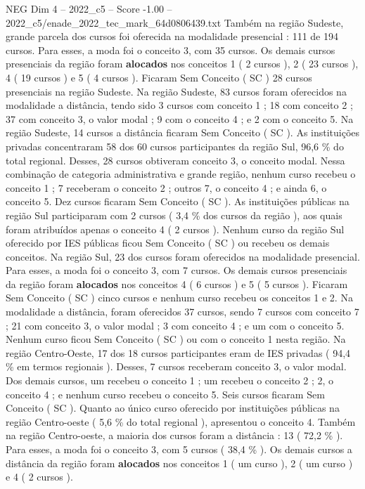 \begin{textsample}{NEG Dim 4 – 2022\_c5 – Score -1.00 – 2022\_c5/enade\_2022\_tec\_mark\_64d0806439.txt}
Também na região Sudeste, grande parcela dos cursos foi oferecida na modalidade presencial : 111 de 194 cursos.
Para esses, a moda foi o conceito 3, com 35 cursos.
Os demais cursos presenciais da região foram \textbf{alocados} nos conceitos 1 ( 2 cursos ), 2 ( 23 cursos ), 4 ( 19 cursos ) e 5 ( 4 cursos ).
Ficaram Sem Conceito ( SC ) 28 cursos presenciais na região Sudeste.
Na região Sudeste, 83 cursos foram oferecidos na modalidade a distância, tendo sido 3 cursos com conceito 1 ; 18 com conceito 2 ; 37 com conceito 3, o valor modal ; 9 com o conceito 4 ; e 2 com o conceito 5.
Na região Sudeste, 14 cursos a distância ficaram Sem Conceito ( SC ).
As instituições privadas concentraram 58 dos 60 cursos participantes da região Sul, 96,6 \% do total regional.
Desses, 28 cursos obtiveram conceito 3, o conceito modal.
Nessa combinação de categoria administrativa e grande região, nenhum curso recebeu o conceito 1 ; 7 receberam o conceito 2 ; outros 7, o conceito 4 ; e ainda 6, o conceito 5.
Dez cursos ficaram Sem Conceito ( SC ).
As instituições públicas na região Sul participaram com 2 cursos ( 3,4 \% dos cursos da região ), aos quais foram atribuídos apenas o conceito 4 ( 2 cursos ).
Nenhum curso da região Sul oferecido por IES públicas ficou Sem Conceito ( SC ) ou recebeu os demais conceitos.
Na região Sul, 23 dos cursos foram oferecidos na modalidade presencial.
Para esses, a moda foi o conceito 3, com 7 cursos.
Os demais cursos presenciais da região foram \textbf{alocados} nos conceitos 4 ( 6 cursos ) e 5 ( 5 cursos ).
Ficaram Sem Conceito ( SC ) cinco cursos e nenhum curso recebeu os conceitos 1 e 2.
Na modalidade a distância, foram oferecidos 37 cursos, sendo 7 cursos com conceito 7 ; 21 com conceito 3, o valor modal ; 3 com conceito 4 ; e um com o conceito 5.
Nenhum curso ficou Sem Conceito ( SC ) ou com o conceito 1 nesta região.
Na região Centro-Oeste, 17 dos 18 cursos participantes eram de IES privadas ( 94,4 \% em termos regionais ).
Desses, 7 cursos receberam conceito 3, o valor modal.
Dos demais cursos, um recebeu o conceito 1 ; um recebeu o conceito 2 ; 2, o conceito 4 ; e nenhum curso recebeu o conceito 5.
Seis cursos ficaram Sem Conceito ( SC ).
Quanto ao único curso oferecido por instituições públicas na região Centro-oeste ( 5,6 \% do total regional ), apresentou o conceito 4.
Também na região Centro-oeste, a maioria dos cursos foram a distância : 13 ( 72,2 \% ).
Para esses, a moda foi o conceito 3, com 5 cursos ( 38,4 \% ).
Os demais cursos a distância da região foram \textbf{alocados} nos conceitos 1 ( um curso ), 2 ( um curso ) e 4 ( 2 cursos ).

\end{textsample}
